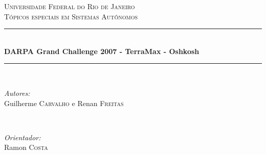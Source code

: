 \documentclass[12pt]{article}
\begin{document}
\begin{titlepage}

\newcommand{\HRule}{\rule{\linewidth}{0.5mm}} %

\center %


\textsc{\LARGE Universidade Federal do Rio de Janeiro}\\[1.5cm]
\textsc{\Large Tópicos especiais em Sistemas Autônomos}\\[0.5cm] %


\HRule \\[0.4cm]
{ \huge \bfseries DARPA Grand Challenge 2007 -  TerraMax - Oshkosh}\\[0.4cm] %
\HRule \\[1.5cm]


\begin{minipage}{0.4\textwidth}
\begin{flushleft} \large
\emph{Autores:}\\
Guilherme \textsc{Carvalho} e Renan \textsc{Freitas}
\end{flushleft}
\end{minipage}
~
\begin{minipage}{0.4\textwidth}
\begin{flushright} \large
\emph{Orientador:} \\
Ramon \textsc{Costa}
\end{flushright}
\end{minipage}\\[2cm]



\end{titlepage}
\end{document}
